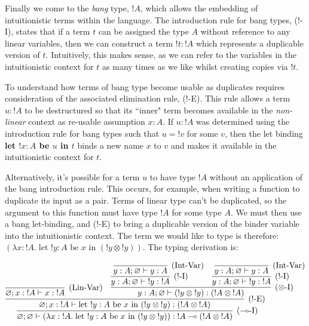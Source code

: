 \documentclass[]{unswthesis}
\let\emptyset\varnothing
\newcommand{\lolly}{\multimap}
\newcommand{\types}{\vdash}
\let\i\textit
\let\b\textbf
\let\t\text
\begin{document}
Finally we come to the \i{bang} type, $!A$, which allows the embedding of intuitionistic terms within the language. The introduction rule for bang types, (!-I), states that if a term $t$ can be assigned the type $A$ without reference to any linear variables, then we can construct a term ${!t} : {!A}$ which represents a duplicable version of $t$. Intuitively, this makes sense, as we can refer to the variables in the intuitionistic context for $t$ as many times as we like whilst creating copies via $!t$.

To understand how terms of bang type become usable as duplicates requires consideration of the associated elimination rule, (!-E). This rule allows a term $u : {!A}$ to be destructured so that its ``inner" term becomes available in the \i{non-linear} context as re-usable assumption $x : A$. If $u : {!A}$ was determined using the introduction rule for bang types such that $u = {!v}$ for some $v$, then the let binding \b{let $!x : A$ be $u$ in $t$} binds a new name $x$ to $v$ and makes it available in the intuitionistic context for $t$.

Alternatively, it's possible for a term $u$ to have type $!A$ without an application of the bang introduction rule. This occurs, for example, when writing a function to duplicate its input as a pair. Terms of linear type can't be duplicated, so the argument to this function must have type $!A$ for some type $A$. We must then use a bang let-binding, and (!-E) to bring a duplicable version of the binder variable into the intuitionistic context. The term we would like to type is therefore: $(\lambda x : {!A}. \; \t{let } {!y} : A \t{ be } x \t{ in } ({!y} \otimes {!y}))$. The typing derivation is:

\begin{eqnarray*}
\infer[\t{($\lolly$-I)}]{\emptyset; \emptyset \types (\lambda x : {!A}. \; \t{let } {!y} : A \t{ be } x \t{ in } ({!y} \otimes {!y})) : {!A} \lolly ({!A} \otimes {!A})}{
  \infer[\t{(!-E)}]{\emptyset; x : {!A} \types \t{let } {!y} : A \t{ be } x \t{ in } ({!y} \otimes {!y}) : ({!A} \otimes {!A})}{
    \infer[\t{(Lin-Var)}]{
      \emptyset; x : {!A} \types x : {!A}
    }{} &
    \infer[\t{($\otimes$-I)}]{
      y : A; \emptyset \types ({!y} \otimes {!y}) : ({!A} \otimes {!A})
    }{
      \infer[\t{(!-I)}]{y : A; \emptyset \types {!y} : {!A}}{
        \infer[\t{(Int-Var)}]{y : A; \emptyset \types y : A}{}
      } &
      \infer[\t{(!-I)}]{y : A; \emptyset \types {!y} : {!A}}{
        \infer[\t{(Int-Var)}]{y : A; \emptyset \types y : A}{}
      }
    }
  }
}
\end{eqnarray*}
\end{document}
